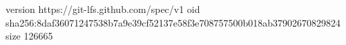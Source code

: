 version https://git-lfs.github.com/spec/v1
oid sha256:8daf36071247538b7a9e39cf52137e58f3e708757500b018ab37902670829824
size 126665
